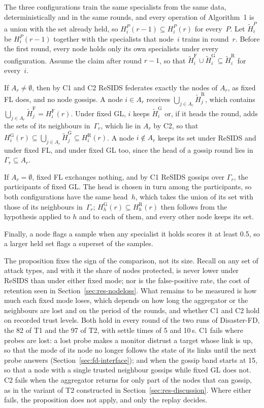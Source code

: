 \begin{pf}
The three configurations train the same specialists from the same data, deterministically and in the
same rounds, and every operation of Algorithm~1 is a union with the set already held, so
$H_i^{P}(r-1)\subseteq H_i^{P}(r)$ for every~$P$. Let $\tilde H_i^{P}$ be $H_i^{P}(r-1)$ together
with the specialists that node~$i$ trains in round~$r$. Before the first round, every node holds only
its own specialists under every configuration. Assume the claim after round $r-1$, so that
$\tilde H_i^{\mathrm{F}}\cup\tilde H_i^{\mathrm{G}}\subseteq\tilde H_i^{\mathrm{R}}$ for every~$i$.

If $A_r\neq\emptyset$, then by C1 and C2 ReSIDS federates exactly the nodes of $A_r$, as fixed FL
does, and no node gossips. A node $i\in A_r$ receives $\bigcup_{j\in A_r}\tilde H_j^{\mathrm{R}}$,
which contains $\bigcup_{j\in A_r}\tilde H_j^{\mathrm{F}}=H_i^{\mathrm{F}}(r)$. Under fixed GL,
$i$ keeps $\tilde H_i^{\mathrm{G}}$ or, if it heads the round, adds the sets of its neighbours
in~$\Gamma_r$, which lie in $A_r$ by C2, so that
$H_i^{\mathrm{G}}(r)\subseteq\bigcup_{j\in A_r}\tilde H_j^{\mathrm{G}}\subseteq H_i^{\mathrm{R}}(r)$.
A node $i\notin A_r$ keeps its set under ReSIDS and under fixed FL, and under fixed GL too, since the
head of a gossip round lies in $\Gamma_r\subseteq A_r$.

If $A_r=\emptyset$, fixed FL exchanges nothing, and by C1 ReSIDS gossips over $\Gamma_r$, the
participants of fixed GL. The head is chosen in turn among the participants, so both configurations
have the same head~$h$, which takes the union of its set with those of its neighbours
in~$\Gamma_r$; $H_h^{\mathrm{G}}(r)\subseteq H_h^{\mathrm{R}}(r)$ then follows from the hypothesis
applied to $h$ and to each of them, and every other node keeps its set.

Finally, a node flags a sample when any specialist it holds scores it at least 0.5, so a larger held
set flags a superset of the samples.
\end{pf}

The proposition fixes the sign of the comparison, not its size. Recall on any set of attack types,
and with it the share of nodes protected, is never lower under ReSIDS than under either fixed mode;
nor is the false-positive rate, the cost of retention seen in Section~\ref{sec:res-nodeloss}. What
remains to be measured is how much each fixed mode loses, which depends on how long the aggregator or
the neighbours are lost and on the period of the rounds, and whether C1 and C2 hold on recorded trust
levels. Both hold in every round of the two runs of Disaster-FD, the 82 of T1 and the 97 of T2, with
settle times of 5 and 10\,s. C1 fails where probes are lost: a lost probe makes a monitor distrust a
target whose link is up, so that the mode of its node no longer follows the state of its links until
the next probe answers (Section~\ref{sec:fd-interface}); and when the gossip band starts at 15, so that a node with a single trusted neighbour gossips while fixed GL does not. C2 fails when
the aggregator returns for only part of the nodes that can gossip, as in the variant of T2 constructed
in Section~\ref{sec:res-discussion}. Where either fails, the proposition does not apply, and only the
replay decides.


